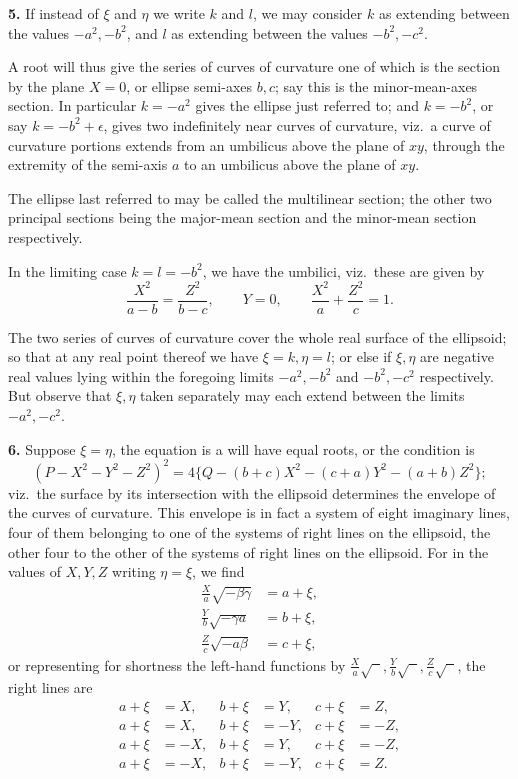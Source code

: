 \documentclass[11pt,a4paper]{article}
\theoremstyle{plain}
\theoremstyle{definition}
\begin{document}
\textbf{5.} If instead of $\xi$ and $\eta$ we write $k$ and $l$, we may consider $k$ as extending between the values $-a^2, -b^2$, and $l$ as extending between the values $-b^2, -c^2$.

A root will thus give the series of curves of curvature one of which is the section by the plane $X = 0$, or ellipse semi-axes $b, c$; say this is the minor-mean-axes section. In particular $k = -a^2$ gives the ellipse just referred to; and $k = -b^2$, or say $k = -b^2 + \epsilon$, gives two indefinitely near curves of curvature, viz.\ a curve of curvature portions extends from an umbilicus above the plane of $xy$, through the extremity of the semi-axis $a$ to an umbilicus above the plane of $xy$.

The ellipse last referred to may be called the multilinear section; the other two principal sections being the major-mean section and the minor-mean section respectively.

In the limiting case $k = l = -b^2$, we have the umbilici, viz.\ these are given by
\[
\frac{X^2}{a - b} = \frac{Z^2}{b - c},\qquad Y = 0,\qquad \frac{X^2}{a} + \frac{Z^2}{c} = 1.
\]

The two series of curves of curvature cover the whole real surface of the ellipsoid; so that at any real point thereof we have $\xi = k, \eta = l$; or else if $\xi, \eta$ are negative real values lying within the foregoing limits $-a^2, -b^2$ and $-b^2, -c^2$ respectively. But observe that $\xi, \eta$ taken separately may each extend between the limits $-a^2, -c^2$.

\textbf{6.} Suppose $\xi = \eta$, the equation is a will have equal roots, or the condition is
\[
(P - X^2 - Y^2 - Z^2)^2 = 4\{Q - (b + c)X^2 - (c + a)Y^2 - (a + b)Z^2\};
\]
viz.\ the surface by its intersection with the ellipsoid determines the envelope of the curves of curvature. This envelope is in fact a system of eight imaginary lines, four of them belonging to one of the systems of right lines on the ellipsoid, the other four to the other of the systems of right lines on the ellipsoid. For in the values of $X, Y, Z$ writing $\eta = \xi$, we find
\begin{align*}
\tfrac{X}{a}\sqrt{-\beta\gamma} &= a + \xi,\\
\tfrac{Y}{b}\sqrt{-\gamma a} &= b + \xi,\\
\tfrac{Z}{c}\sqrt{-a\beta} &= c + \xi,
\end{align*}
or representing for shortness the left-hand functions by $\tfrac{X}{a}\sqrt{\phantom{x}}, \tfrac{Y}{b}\sqrt{\phantom{x}}, \tfrac{Z}{c}\sqrt{\phantom{x}}$, the right lines are
\begin{align*}
a + \xi &= X,& b + \xi &= Y,& c + \xi &= Z,\\
a + \xi &= X,& b + \xi &= -Y,& c + \xi &= -Z,\\
a + \xi &= -X,& b + \xi &= Y,& c + \xi &= -Z,\\
a + \xi &= -X,& b + \xi &= -Y,& c + \xi &= Z.
\end{align*}
\end{document}
